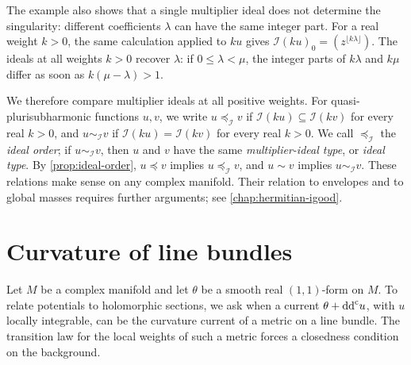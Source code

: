 The example also shows that a single multiplier ideal does not determine the singularity: different coefficients $\lambda$ can have the same integer part. For a real weight $k>0$, the same calculation applied to $ku$ gives $\mathcal I(ku)_0=(z^{\lfloor k\lambda\rfloor})$. The ideals at all weights $k>0$ recover $\lambda$: if $0\leq\lambda<\mu$, the integer parts of $k\lambda$ and $k\mu$ differ as soon as $k(\mu-\lambda)>1$.

We therefore compare multiplier ideals at all positive weights. For quasi-plurisubharmonic functions $u,v$, we write $u\preceq_{\mathcal I}v$ if $\mathcal I(ku)\subseteq\mathcal I(kv)$ for every real $k>0$, and $u\sim_{\mathcal I}v$ if $\mathcal I(ku)=\mathcal I(kv)$ for every real $k>0$. We call $\preceq_{\mathcal I}$ the \emph{ideal order}; if $u\sim_{\mathcal I}v$, then $u$ and $v$ have the same \emph{multiplier-ideal type}, or \emph{ideal type}. By \cref{prop:ideal-order}, $u\preceq v$ implies $u\preceq_{\mathcal I}v$, and $u\sim v$ implies $u\sim_{\mathcal I}v$. These relations make sense on any complex manifold. Their relation to envelopes and to global masses requires further arguments; see \cref{chap:hermitian-igood}.













\section{Curvature of line bundles}

Let $M$ be a complex manifold and let $\theta$ be a smooth real $(1,1)$-form on $M$. To relate potentials to holomorphic sections, we ask when a current $\theta+\mathrm{dd}^{\mathrm{c}} u$, with $u$ locally integrable, can be the curvature current of a metric on a line bundle. The transition law for the local weights of such a metric forces a closedness condition on the background.

